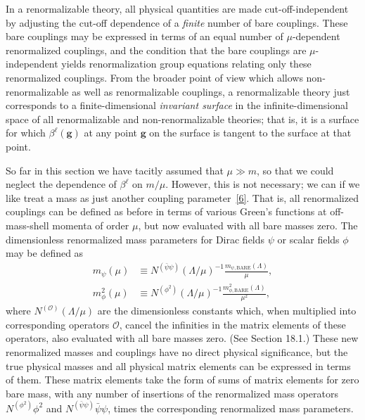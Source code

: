 In a renormalizable theory, all physical quantities are made cut-off-independent by adjusting the cut-off dependence of a \emph{finite} number of bare couplings. These bare couplings may be expressed in terms of an equal number of $\mu$-dependent renormalized couplings, and the condition that the bare couplings are $\mu$-independent yields renormalization group equations relating only these renormalized couplings. From the broader point of view which allows non-renormalizable as well as renormalizable couplings, a renormalizable theory just corresponds to a finite-dimensional \emph{invariant surface} in the infinite-dimensional space of all renormalizable and non-renormalizable theories; that is, it is a surface for which $\beta^\ell(\mathbf{g})$ at any point $\mathbf{g}$ on the surface is tangent to the surface at that point.

So far in this section we have tacitly assumed that $\mu\gg m$, so that we could neglect the dependence of $\beta^\ell$ on $m/\mu$. However, this is not necessary; we can if we like treat a mass as just another coupling parameter~\hyperref[ch18-ref-6]{[6]}. That is, all renormalized couplings can be defined as before in terms of various Green's functions at off-mass-shell momenta of order $\mu$, but now evaluated with all bare masses zero. The dimensionless renormalized mass parameters for Dirac fields $\psi$ or scalar fields $\phi$ may be defined as
\begin{align}
m_\psi(\mu)&\equiv N^{(\bar\psi\psi)}(\Lambda/\mu)^{-1}
\frac{m_{\psi,\mathrm{BARE}}(\Lambda)}{\mu},
\tag{18.4.13}\label{eq:18.4.13}\\
m_\phi^2(\mu)&\equiv N^{(\phi^2)}(\Lambda/\mu)^{-1}
\frac{m_{\phi,\mathrm{BARE}}^2(\Lambda)}{\mu^2},
\tag{18.4.14}\label{eq:18.4.14}
\end{align}
where $N^{(\mathcal O)}(\Lambda/\mu)$ are the dimensionless constants which, when multiplied into corresponding operators $\mathcal O$, cancel the infinities in the matrix elements of these operators, also evaluated with all bare masses zero. (See Section 18.1.) These new renormalized masses and couplings have no direct physical significance, but the true physical masses and all physical matrix elements can be expressed in terms of them. These matrix elements take the form of sums of matrix elements for zero bare mass, with any number of insertions of the renormalized mass operators $N^{(\phi^2)}\phi^2$ and $N^{(\bar\psi\psi)}\bar\psi\psi$, times the corresponding renormalized mass parameters.

